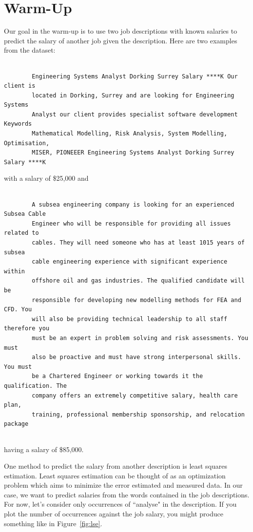 \documentclass[12pt]{article}
\begin{document}
\section{Warm-Up}

    Our goal in the warm-up is to use two job descriptions with known
    salaries to predict the salary of another job given the description. Here
    are two examples from the dataset: 
    
    \begin{lstlisting}

        Engineering Systems Analyst Dorking Surrey Salary ****K Our client is
        located in Dorking, Surrey and are looking for Engineering Systems
        Analyst our client provides specialist software development Keywords
        Mathematical Modelling, Risk Analysis, System Modelling, Optimisation,
        MISER, PIONEEER Engineering Systems Analyst Dorking Surrey Salary ****K

    \end{lstlisting}

    with a salary of \$25,000 and 

    \begin{lstlisting}

        A subsea engineering company is looking for an experienced Subsea Cable
        Engineer who will be responsible for providing all issues related to
        cables. They will need someone who has at least 1015 years of subsea
        cable engineering experience with significant experience within
        offshore oil and gas industries. The qualified candidate will be
        responsible for developing new modelling methods for FEA and CFD. You
        will also be providing technical leadership to all staff therefore you
        must be an expert in problem solving and risk assessments. You must
        also be proactive and must have strong interpersonal skills. You must
        be a Chartered Engineer or working towards it the qualification. The
        company offers an extremely competitive salary, health care plan,
        training, professional membership sponsorship, and relocation package
    
    \end{lstlisting} having a salary of \$85,000.

    One method to predict the salary from another description is least squares
    estimation.  Least squares estimation can be thought of as an optimization
    problem which aims to minimize the error estimated and measured data.  In
    our case, we want to predict salaries from the words contained in the job
    descriptions.  For now, let's consider only occurrences of ``analyse" in
    the description.  If you plot the number of occurrences against the job
    salary, you might produce something like in Figure~\ref{fig:lse}.
    
\end{document}
